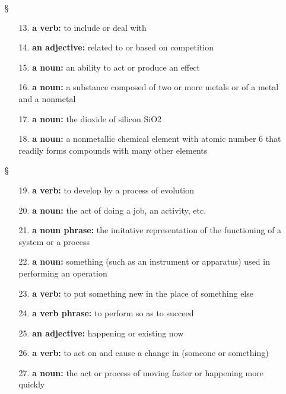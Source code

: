\begin{enumerate}
\begin{enumerate}
            \end{enumerate}
      \item[§] 
            \begin{enumerate}
                  \item[13.] \textbf{a verb:} to include or deal with
                  \item[14.] \textbf{an adjective:} related to or based on competition
                  \item[15.] \textbf{a noun:} an ability to act or produce an effect
                  \item[16.] \textbf{a noun:} a substance composed of two or more metals or of a metal and a nonmetal
                  \item[17.] \textbf{a noun:} the dioxide of silicon SiO2
                  \item[18.] \textbf{a noun:} a nonmetallic chemical element with atomic number 6 that readily forms compounds with many other elements
            \end{enumerate}
      \item[§] 
            \begin{enumerate}
                  \item[19.] \textbf{a verb:} to develop by a process of evolution
                  \item[20.] \textbf{a noun:} the act of doing a job, an activity, etc.
                  \item[21.] \textbf{a noun phrase:} the imitative representation of the functioning of a system or a process
                  \item[22.] \textbf{a noun:} something (such as an instrument or apparatus) used in performing an operation
                  \item[23.] \textbf{a verb:} to put something new in the place of something else
                  \item[24.] \textbf{a verb phrase:} to perform so as to succeed
                  \item[25.] \textbf{an adjective:} happening or existing now
                  \item[26.] \textbf{a verb:} to act on and cause a change in (someone or something)
                  \item[27.] \textbf{a noun:} the act or process of moving faster or happening more quickly
            \end{enumerate}
\end{enumerate}

